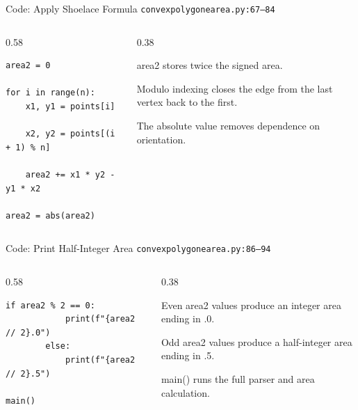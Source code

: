 \documentclass[aspectratio=169,11pt]{beamer}
\begin{document}
\begin{frame}[fragile]{Code: Apply Shoelace Formula}
\scriptsize
{} \texttt{convexpolygonearea.py:67--84}

\vspace{0.08cm}
\begin{columns}[T,totalwidth=\textwidth]
\begin{column}{0.58\textwidth}
\begin{lstlisting}[style=cpcode]
area2 = 0

for i in range(n):
    x1, y1 = points[i]

    x2, y2 = points[(i + 1) % n]

    area2 += x1 * y2 - y1 * x2

area2 = abs(area2)
\end{lstlisting}
\end{column}
\begin{column}{0.38\textwidth}
\begin{tightitemize}
  \item area2 stores twice the signed area.
  \item Modulo indexing closes the edge from the last vertex back to the first.
  \item The absolute value removes dependence on orientation.
\end{tightitemize}
\end{column}
\end{columns}
\end{frame}

\begin{frame}[fragile]{Code: Print Half-Integer Area}
\scriptsize
{} \texttt{convexpolygonearea.py:86--94}

\vspace{0.08cm}
\begin{columns}[T,totalwidth=\textwidth]
\begin{column}{0.58\textwidth}
\begin{lstlisting}[style=cpcode]
        if area2 % 2 == 0:
            print(f"{area2 // 2}.0")
        else:
            print(f"{area2 // 2}.5")

main()
\end{lstlisting}
\end{column}
\begin{column}{0.38\textwidth}
\begin{tightitemize}
  \item Even area2 values produce an integer area ending in .0.
  \item Odd area2 values produce a half-integer area ending in .5.
  \item main() runs the full parser and area calculation.
\end{tightitemize}
\end{column}
\end{columns}
\end{frame}
\end{document}
